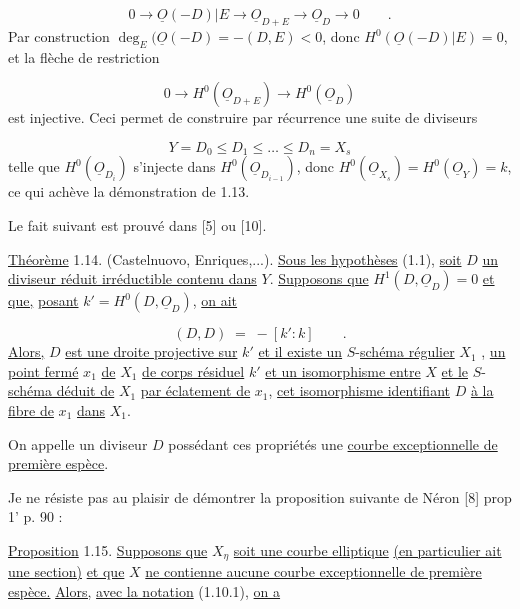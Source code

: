 \begin{equation*}
0 \longrightarrow \underline{O}(-D)|E \longrightarrow \underline{O}_{D+E} \longrightarrow \underline{O}_D \longrightarrow 0 \qquad .
\end{equation*}
Par construction $\deg_E(\underline{O}(-D) = - (D,E) < 0$, donc $H^0(\underline{O}(-D)|E) = 0$, et la flèche de restriction

\begin{equation*}
0 \longrightarrow H^0(\underline{O}_{D+E}) \longrightarrow H^0(\underline{O}_D)
\end{equation*}
est injective. Ceci permet de construire par récurrence une suite de diviseurs

\begin{equation*}
Y = D_0 \leq D_1 \leq \ldots \leq D_n = X_s
\end{equation*}
telle que $H^0(\underline{O}_{D_i})$ s'injecte dans $H^0(\underline{O}_{D_{i-1}})$, donc $H^0(\underline{O}_{X_s}) = H^0(\underline{O}_Y) = k$, ce qui achève la démonstration de 1.13.



Le fait suivant est prouvé dans [5] ou [10].

\underline{Théorème} 1.14. (Castelnuovo, Enriques,...). \underline{Sous les hypothèses} (1.1), \underline{soit} $D$ \underline{un diviseur réduit irréductible contenu dans} $Y$. \underline{Supposons que} $H^1(D,\underline{O}_D) = 0$ \underline{et que,} \underline{posant} $k' = H^0(D,\underline{O}_D)$, \underline{on ait}

\begin{equation*}
(D,D) \; = \; - [k' : k] \qquad .
\end{equation*}
\underline{Alors,} $D$ \underline{est une droite projective sur} $k'$ \underline{et il existe un} $S$-\underline{schéma régulier} $X_1$ , \underline{un point fermé} $x_1$ \underline{de} $X_1$ \underline{de corps résiduel} $k'$ \underline{et un isomorphisme entre} $X$ \underline{et le} $S$-\underline{schéma déduit de} $X_1$ \underline{par éclatement de} $x_1$, \underline{cet isomorphisme identifiant} $D$ \underline{à la fibre de} $x_1$ \underline{dans} $X_1$.

On appelle un diviseur $D$ possédant ces propriétés une \underline{courbe exceptionnelle de première espèce}.

Je ne résiste pas au plaisir de démontrer la proposition suivante de Néron [8] prop 1' p. 90 :

\underline{Proposition} 1.15. \underline{Supposons que} $X_\eta$ \underline{soit une courbe elliptique} \underline{(en particulier ait une section)} \underline{et que} $X$ \underline{ne contienne aucune courbe exceptionnelle de première espèce.} \underline{Alors,} \underline{avec la notation} (1.10.1), \underline{on a}

